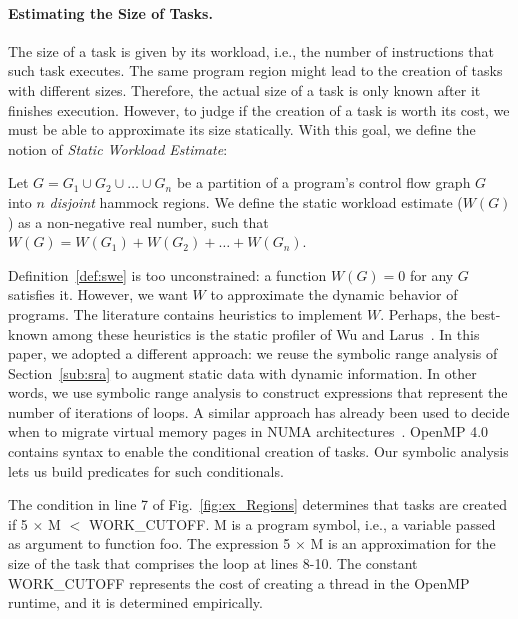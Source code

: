 \documentclass[sigplan,10pt,screen]{acmart}
\begin{document}
\paragraph{Estimating the Size of Tasks.}
The size of a task is given by its workload, i.e., the number of instructions 
that such task executes.
The same program region might lead to the creation of tasks with different sizes.
Therefore, the actual size of a task is only known after it finishes execution.
However, to judge if the creation of a task is worth its cost, we must be able to
approximate its size statically.
With this goal, we define the notion of {\em Static Workload Estimate}:

\begin{definition}
\label{def:swe}
Let $G = G_1 \cup G_2 \cup \ldots \cup G_n$ be a partition of a program's control
flow graph $G$ into $n$ {\em disjoint} hammock regions.
We define the static workload estimate ($W(G)$) as a non-negative real number,
such that $W(G) = W(G_1) + W(G_2) + \ldots + W(G_n)$.
\end{definition}

Definition~\ref{def:swe} is too unconstrained: a function $W(G) = 0$ for any $G$
satisfies it.
However, we want $W$ to approximate the dynamic behavior of programs.
The literature contains heuristics to implement $W$.
Perhaps, the best-known among these heuristics is the static profiler of
Wu and Larus~\cite{Wu94}.
In this paper, we adopted a different approach: we reuse the symbolic range
analysis of Section~\ref{sub:sra} to augment static data with dynamic information.
In other words, we use symbolic range analysis to construct expressions that
represent the number of iterations of loops.
A similar approach has already been used to decide when to migrate virtual memory
pages in NUMA architectures~\cite{Piccoli14}.
OpenMP 4.0 contains syntax to enable the conditional creation of tasks.
Our symbolic analysis lets us build predicates for such conditionals.

\begin{example}
\label{ex:cond_task}
The condition in line 7 of Fig.~\ref{fig:ex_Regions} determines that tasks are
created if \textsf{5 $\times$ M $<$ WORK\_CUTOFF}.
\textsf{M} is a program symbol, i.e., a variable passed as argument to
function \textsf{foo}.
The expression \textsf{5 $\times$ M} is an approximation for the size of the
task that comprises the loop at lines 8-10.
The constant \textsf{WORK\_CUTOFF} represents the cost of creating a thread
in the OpenMP runtime, and it is determined empirically.
\end{example}
\end{document}
